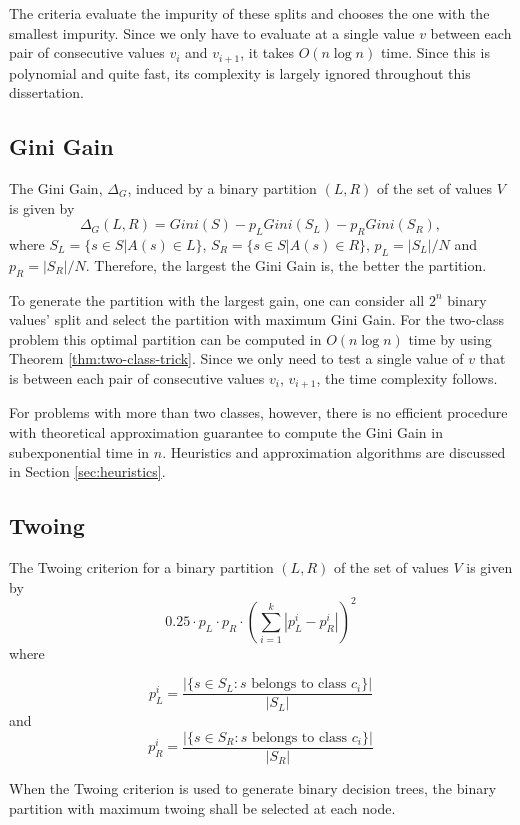 The criteria evaluate the impurity of these splits and chooses the one with the smallest impurity. Since we only have to evaluate at a single value $v$ between each pair of consecutive values $v_i$ and $v_{i+1}$, it takes $O(n \log n)$ time. Since this is polynomial and quite fast, its complexity is largely ignored throughout this dissertation.

\subsection{Gini Gain}

The Gini Gain, $\Delta_G$, induced by a binary partition $(L,R)$ of the set of values $V$ is given by 
\begin{equation}
 \Delta_G (L,R) = Gini(S) -
p_L Gini(S_L) - p_R Gini(S_R),
\label{eq:Ginigain}
\end{equation}
where $S_L= \{ s \in S | A(s) \in L \}$, $S_R= \{ s \in S | A(s) \in R \}$,
 $p_L=|S_L| /N $
and $p_R=|S_R| /N$. Therefore, the largest the Gini Gain is, the better the partition.

To generate the partition with the largest gain, one can consider all $2^n$ binary values' split and select the partition with maximum Gini Gain.
For the two-class problem this optimal partition can be computed  in $O(n \log n)$ time by using Theorem \ref{thm:two-class-trick}. Since we only need to test a single value of $v$ that is between each pair of consecutive values $v_i$, $v_{i+1}$, the time complexity follows.

For problems with more than two classes, however, there is no efficient procedure with theoretical approximation guarantee to compute the Gini Gain in subexponential time in $n$. Heuristics and approximation algorithms are discussed in Section \ref{sec:heuristics}.

\subsection{Twoing}
The Twoing criterion
for a  binary partition $(L,R)$ 
of the set of values $V$ is given by
$$ 0.25 \cdot p_L \cdot p_R  \cdot \left ( \sum_{i=1}^k | p_L^i - p_R^i | \right )^2$$
where

$$ p_L^i= \frac{|\{s \in S_L: s \mbox{ belongs to class } c_i \}|}{ |S_L|} $$
 and 
$$ p_R^i= \frac{|\{s \in S_R: s \mbox{ belongs to class } c_i\} |}{ |S_R|} $$

When the Twoing criterion is used to generate binary decision trees, the binary partition with maximum twoing shall be selected at each node. 

